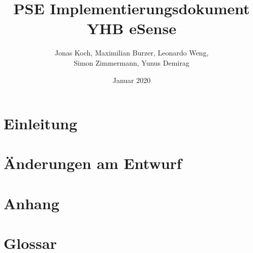 \documentclass[12pt,a4paper,titlepage,ngerman]{article}
\title{PSE Implementierungsdokument YHB eSense}
\author{Jonas Koch, Maximilian Burzer, Leonardo Weng, \\ Simon Zimmermann, Yunus Demirag}
\date{Januar 2020}
\begin{document}
	
	\part{Einleitung}
	
	\part{Änderungen am Entwurf}
	
	\newpage
	
	\newpage
	
	\newpage
	
	\newpage
	
	\newpage
	
	\newpage
	
	\newpage
	
	\newpage
	
	\part{Anhang}
	
	\part{Glossar}
	
\end{document}

